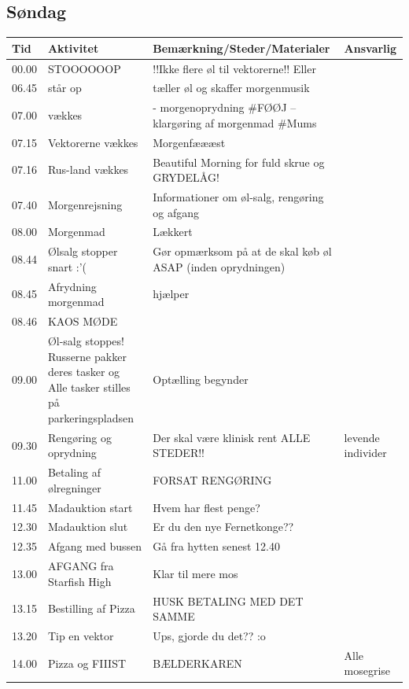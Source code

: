\subsection{Søndag}
\begin{tabular}{ | p{1cm} | p{4cm} | p{5.5cm} | p{4cm} | }
\hline
	Tid & Aktivitet & Bemærkning/Steder/Materialer & Ansvarlig \\ \hline
	00.00 & STOOOOOOP & !!Ikke flere øl til vektorerne!! Eller \KABS & \Alle \\ \hline
	06.45 & \Ora står op & \Lucyfar tæller øl og skaffer morgenmusik & \Ora \Lucyfar \\ \hline
	07.00 & \Poppere \Fransk \Alternative vækkes & \Poppere \Fransk - morgenoprydning \#FØØJ \Alternative – klargøring af morgenmad \#Mums & \Ora \\ \hline
	07.15 & Vektorerne vækkes & Morgenfæææst &  \\ \hline
	07.16 & Rus-land vækkes & Beautiful Morning for fuld skrue og GRYDELÅG! & \Alle \\ \hline
	07.40 & Morgenrejsning & Informationer om øl-salg, rengøring og afgang & \KABS \Ora \\ \hline
	08.00 & Morgenmad & Lækkert & \Hyttebombz{} \\ \hline
	08.44 & Ølsalg stopper snart :'( & Gør opmærksom på at de skal køb øl ASAP (inden oprydningen) & \Ora \\ \hline
	08.45 & Afrydning morgenmad & \Bad hjælper \Hyttebombz{} & \Hyttebombz{} \Johnny \\ \hline
	08.46 & KAOS MØDE &  & \Alle \\ \hline
	09.00 & Øl-salg stoppes! Russerne pakker deres tasker og Alle tasker stilles på parkeringspladsen & Optælling begynder & \YOLO \Lucyfar \\ \hline
	09.30 & Rengøring og oprydning & Der skal være klinisk rent ALLE STEDER!! & \Alle levende individer \\ \hline
	11.00 & Betaling af ølregninger & FORSAT RENGØRING & \YOLO \Lucyfar \\ \hline
	11.45 & Madauktion start & Hvem har flest penge? & \Hyttebombz{} \\ \hline
	12.30 & Madauktion slut & Er du den nye Fernetkonge?? & \Hyttebombz{} \\ \hline
	12.35 & Afgang med bussen & Gå fra hytten senest 12.40 & \Ora \Lucyfar \YOLO \BIATCH \Johnny \Gabriel \\ \hline
	13.00 & AFGANG fra Starfish High & Klar til mere mos & \Ora \Lucyfar \YOLO \BIATCH \Johnny \Gabriel \\ \hline
	13.15 & Bestilling af Pizza & HUSK BETALING MED DET SAMME & \Ora \\ \hline
	13.20 & Tip en vektor & Ups, gjorde du det?? :o & \YOLO \\ \hline
	14.00 & Pizza og FIIIST & BÆLDERKAREN & Alle mosegrise \\ \hline
\end{tabular}

